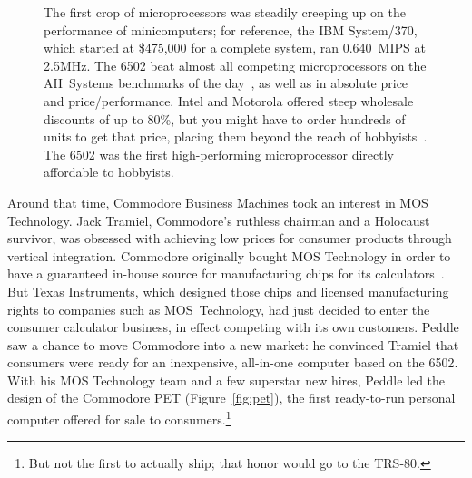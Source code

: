 \begin{figure}
  
  \caption{\label{fig:price_performance} 
    The first crop of microprocessors was steadily creeping up on the
    performance of minicomputers; for reference, the IBM System/370,
    which started at \$475,000 for a complete system, ran 0.640~MIPS at
    2.5MHz. 
    The 6502 beat almost all competing microprocessors on the AH~Systems benchmarks of
    the day~\cite{edn75:6502}, as well as in absolute price and price/performance.
    Intel and Motorola offered steep wholesale discounts of up to 80\%,
    but you might have to order hundreds of units to
    get that price, placing them beyond the reach of
    hobbyists~\cite[p. 228]{ceruzzi}.  The 6502 was the first
    high-performing microprocessor directly affordable to hobbyists.}
\end{figure}




Around that time, Commodore Business Machines took an interest in MOS
Technology.
Jack Tramiel, Commodore's ruthless chairman and a Holocaust survivor,
was obsessed with achieving low prices for consumer products through
vertical integration.
Commodore originally bought MOS Technology in order to have a
guaranteed in-house source for manufacturing chips for its
calculators~\cite{commodore}.
But Texas Instruments, which designed those chips and licensed
manufacturing rights to companies such as MOS~Technology, had just
decided to enter the consumer calculator business, in effect competing
with its own customers.
Peddle saw a chance to move Commodore into a new market: he convinced
Tramiel that consumers were ready for an inexpensive, all-in-one computer based on
the 6502.
With his MOS Technology team and a few superstar new hires, Peddle led
the design of the Commodore PET (Figure~\ref{fig:pet}), the first
ready-to-run personal computer offered for sale to consumers.\footnote{But not
the first to actually ship; that honor would go to the TRS-80.}

